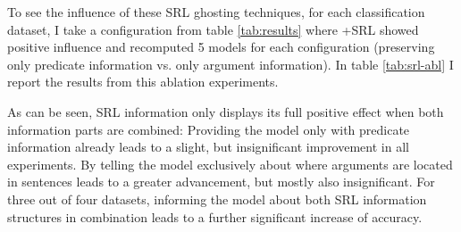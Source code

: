 {To see the influence of these SRL ghosting techniques, for each classification dataset, I take a
configuration from table \ref{tab:results} where +SRL showed positive influence and recomputed 5
models for each configuration (preserving only predicate information vs. only argument information).
In table \ref{tab:srl-abl} I report the results from this ablation experiments.




As can be seen, SRL information only displays its full positive effect when both information parts are combined: Providing
the model only with predicate information already leads to a slight, but insignificant improvement in all experiments.
By telling the model exclusively about where arguments are located in sentences leads to a greater advancement, but
mostly also insignificant. For three out of four datasets, informing the model about both SRL information structures
in combination leads to a further significant increase of accuracy.

}
